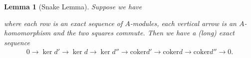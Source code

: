 \documentclass[12pt]{report}
\theoremstyle{plain}
\newtheorem{lemma}[theorem]{Lemma}
\theoremstyle{remark}
\theoremstyle{definition}
\begin{document}
\begin{lemma}[Snake Lemma]
    Suppose we have
    \begin{figure}[H]
        \centering
    \end{figure}
    \noindent where each row is an exact sequence of $A$-modules, each vertical arrow is an $A$-homomorphism and the two squares commute. Then we have a (long) exact sequence
    \begin{align*}
        0\rightarrow \ker d'\rightarrow \ker d\rightarrow \ker d''\rightarrow\mathrm{coker}d'\rightarrow \mathrm{coker}d\rightarrow \mathrm{coker}d''\rightarrow 0.
    \end{align*}
\end{lemma}
\end{document}
